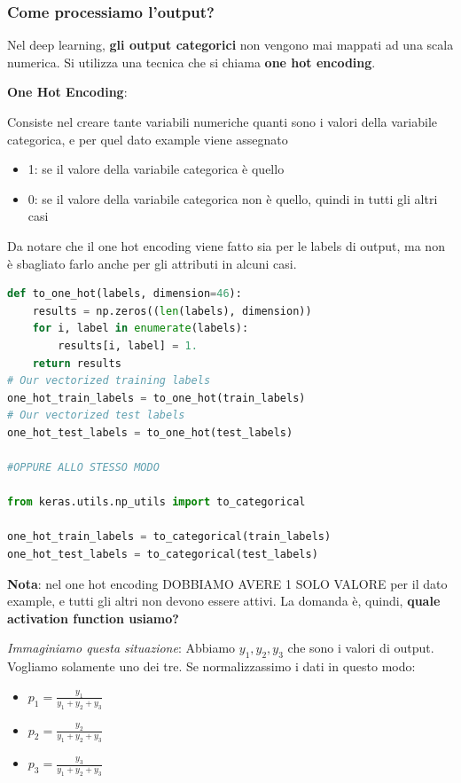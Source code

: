 \subsubsection{Come processiamo l'output?}

Nel deep learning, \textbf{gli output categorici} non vengono mai mappati ad
una scala numerica. Si utilizza una tecnica che si chiama \textbf{one hot
    encoding}.

\textbf{One Hot Encoding}:

Consiste nel creare tante variabili numeriche quanti sono i valori della
variabile categorica, e per quel dato example viene assegnato
\begin{itemize}
    \item 1: se il valore della variabile categorica è quello
    \item 0: se il valore della variabile categorica non è quello, quindi in tutti gli altri casi
\end{itemize}

Da notare che il one hot encoding viene fatto sia per le labels di output, ma
non è sbagliato farlo anche per gli attributi in alcuni casi.

\begin{lstlisting}[language=Python]
def to_one_hot(labels, dimension=46):
    results = np.zeros((len(labels), dimension))
    for i, label in enumerate(labels):
        results[i, label] = 1.
    return results
# Our vectorized training labels
one_hot_train_labels = to_one_hot(train_labels)
# Our vectorized test labels
one_hot_test_labels = to_one_hot(test_labels)

#OPPURE ALLO STESSO MODO

from keras.utils.np_utils import to_categorical

one_hot_train_labels = to_categorical(train_labels)
one_hot_test_labels = to_categorical(test_labels)
\end{lstlisting}

\textbf{Nota}: nel one hot encoding DOBBIAMO AVERE 1 SOLO VALORE per il dato example, e tutti gli altri non devono essere attivi.
La domanda è, quindi, \textbf{quale activation function usiamo?}

\textit{Immaginiamo questa situazione}: Abbiamo $y_1, y_2, y_3$ che sono i valori di output. Vogliamo solamente uno dei tre.
Se normalizzassimo i dati in questo modo:
\begin{itemize}
    \item $p_1 = \frac{y_1}{y_1+y_2+y_3}$
    \item $p_2 = \frac{y_2}{y_1+y_2+y_3}$
    \item $p_3 = \frac{y_3}{y_1+y_2+y_3}$
\end{itemize}

